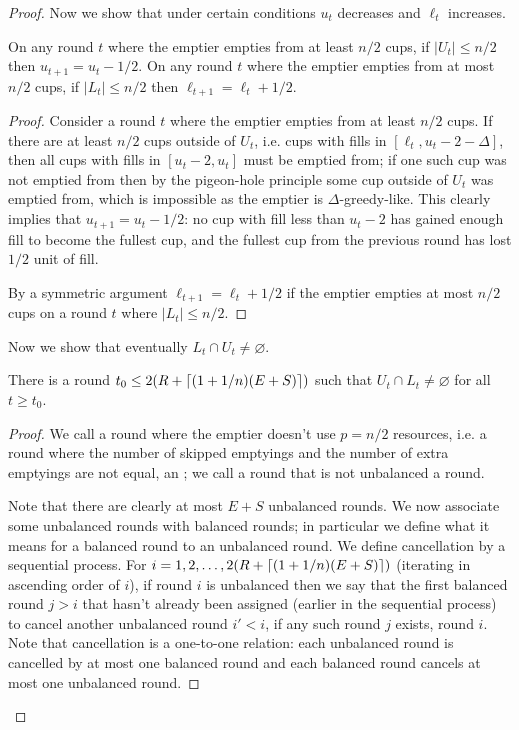 \begin{proof}
  Now we show that under certain conditions $u_t$ decreases and
  $\ell_t$ increases.
  \begin{clm}
    \label{clm:howDoLandUchange}
    On any round $t$ where the emptier empties from at least
    $n/2$ cups, if $|U_t| \le n/2$ then $u_{t+1} = u_t - 1/2$.
    On any round $t$ where the emptier empties from at most $n/2$
    cups, if $|L_t| \le n/2$ then $\ell_{t+1} = \ell_t + 1/2$.
  \end{clm}
  \begin{proof}
    Consider a round $t$ where the emptier empties from at least
    $n/2$ cups. If there are at least $n/2$ cups outside of
    $U_t$, i.e. cups with fills in $[\ell_t, u_t-2-\Delta]$, then
    all cups with fills in $[u_t - 2, u_t]$ must be emptied from;
    if one such cup was not emptied from then by the pigeon-hole
    principle some cup outside of $U_t$ was emptied from, which
    is impossible as the emptier is $\Delta$-greedy-like. This
    clearly implies that $u_{t+1} = u_t - 1/2$: no cup with fill
    less than $u_t-2$ has gained enough fill to become the
    fullest cup, and the fullest cup from the previous round has
    lost $1/2$ unit of fill.

    By a symmetric argument $\ell_{t+1} = \ell_{t} + 1/2$ if the
    emptier empties at most $n/2$ cups on a round $t$ where
    $|L_t| \le n/2$. 
  \end{proof}

  Now we show that eventually $L_t \cap U_t \neq \varnothing$.
  \begin{clm}
    There is a round $t_0 \le 2(R + \left\lceil (1+1/n)(E + S) \right\rceil)$ such that $U_{t}
    \cap L_{t} \neq \varnothing$ for all $t\ge t_0$.
  \end{clm}
  \begin{proof}
  We call a round where the emptier doesn't use $p=n/2$
  resources, i.e. a round where the number of skipped emptyings
  and the number of extra emptyings are not equal, an
  ; we call a round that is not unbalanced a
   round. 

  Note that there are clearly at most $E+S$ unbalanced rounds.
  We now associate some unbalanced rounds with balanced rounds;
  in particular we define what it means for a balanced round to
   an unbalanced round. We define cancellation by a
  sequential process. For $i = 1,2,\ldots,
  2(R+\left\lceil (1+1/n)(E+S) \right\rceil)$ (iterating in ascending order of $i$), if round $i$
  is unbalanced then we say that the first balanced round $j > i$
  that hasn't already been assigned (earlier in the sequential
  process) to cancel another unbalanced round $i' < i$, if any
  such round $j$ exists,  round $i$. Note that
  cancellation is a one-to-one relation: each unbalanced round is
  cancelled by at most one balanced round and each balanced round
  cancels at most one unbalanced round.


\end{proof}
\end{proof}
